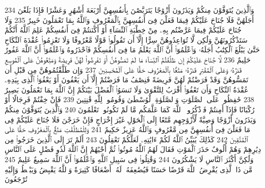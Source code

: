{\tiny\colorbox{cl_aya}{234}} وَٱلَّذِينَ يُتَوَفَّوْنَ مِنكُمْ وَيَذَرُونَ أَزْوَٰجًا يَتَرَبَّصْنَ بِأَنفُسِهِنَّ أَرْبَعَةَ أَشْهُرٍ وَعَشْرًا فَإِذَا بَلَغْنَ أَجَلَهُنَّ فَلَا جُنَاحَ عَلَيْكُمْ فِيمَا فَعَلْنَ فِىٓ أَنفُسِهِنَّ بِٱلْمَعْرُوفِ وَٱللَّهُ بِمَا تَعْمَلُونَ خَبِيرٌ
{\tiny\colorbox{cl_aya}{235}} وَلَا جُنَاحَ عَلَيْكُمْ فِيمَا عَرَّضْتُم بِهِۦ مِنْ خِطْبَةِ ٱلنِّسَآءِ أَوْ أَكْنَنتُمْ فِىٓ أَنفُسِكُمْ عَلِمَ ٱللَّهُ أَنَّكُمْ سَتَذْكُرُونَهُنَّ وَلَٰكِن لَّا تُوَاعِدُوهُنَّ سِرًّا إِلَّآ أَن تَقُولُوا۟ قَوْلًا مَّعْرُوفًا وَلَا تَعْزِمُوا۟ عُقْدَةَ ٱلنِّكَاحِ حَتَّىٰ يَبْلُغَ ٱلْكِتَٰبُ أَجَلَهُۥ وَٱعْلَمُوٓا۟ أَنَّ ٱللَّهَ يَعْلَمُ مَا فِىٓ أَنفُسِكُمْ فَٱحْذَرُوهُ وَٱعْلَمُوٓا۟ أَنَّ ٱللَّهَ غَفُورٌ حَلِيمٌ
{\tiny\colorbox{cl_aya}{236}} لَّا جُنَاحَ عَلَيْكُمْ إِن طَلَّقْتُمُ ٱلنِّسَآءَ مَا لَمْ تَمَسُّوهُنَّ أَوْ تَفْرِضُوا۟ لَهُنَّ فَرِيضَةً وَمَتِّعُوهُنَّ عَلَى ٱلْمُوسِعِ قَدَرُهُۥ وَعَلَى ٱلْمُقْتِرِ قَدَرُهُۥ مَتَٰعًۢا بِٱلْمَعْرُوفِ حَقًّا عَلَى ٱلْمُحْسِنِينَ
{\tiny\colorbox{cl_aya}{237}} وَإِن طَلَّقْتُمُوهُنَّ مِن قَبْلِ أَن تَمَسُّوهُنَّ وَقَدْ فَرَضْتُمْ لَهُنَّ فَرِيضَةً فَنِصْفُ مَا فَرَضْتُمْ إِلَّآ أَن يَعْفُونَ أَوْ يَعْفُوَا۟ ٱلَّذِى بِيَدِهِۦ عُقْدَةُ ٱلنِّكَاحِ وَأَن تَعْفُوٓا۟ أَقْرَبُ لِلتَّقْوَىٰ وَلَا تَنسَوُا۟ ٱلْفَضْلَ بَيْنَكُمْ إِنَّ ٱللَّهَ بِمَا تَعْمَلُونَ بَصِيرٌ
{\tiny\colorbox{cl_aya}{238}} حَٰفِظُوا۟ عَلَى ٱلصَّلَوَٰتِ وَٱلصَّلَوٰةِ ٱلْوُسْطَىٰ وَقُومُوا۟ لِلَّهِ قَٰنِتِينَ
{\tiny\colorbox{cl_aya}{239}} فَإِنْ خِفْتُمْ فَرِجَالًا أَوْ رُكْبَانًا فَإِذَآ أَمِنتُمْ فَٱذْكُرُوا۟ ٱللَّهَ كَمَا عَلَّمَكُم مَّا لَمْ تَكُونُوا۟ تَعْلَمُونَ
{\tiny\colorbox{cl_aya}{240}} وَٱلَّذِينَ يُتَوَفَّوْنَ مِنكُمْ وَيَذَرُونَ أَزْوَٰجًا وَصِيَّةً لِّأَزْوَٰجِهِم مَّتَٰعًا إِلَى ٱلْحَوْلِ غَيْرَ إِخْرَاجٍ فَإِنْ خَرَجْنَ فَلَا جُنَاحَ عَلَيْكُمْ فِى مَا فَعَلْنَ فِىٓ أَنفُسِهِنَّ مِن مَّعْرُوفٍ وَٱللَّهُ عَزِيزٌ حَكِيمٌ
{\tiny\colorbox{cl_aya}{241}} وَلِلْمُطَلَّقَٰتِ مَتَٰعٌۢ بِٱلْمَعْرُوفِ حَقًّا عَلَى ٱلْمُتَّقِينَ
{\tiny\colorbox{cl_aya}{242}} كَذَٰلِكَ يُبَيِّنُ ٱللَّهُ لَكُمْ ءَايَٰتِهِۦ لَعَلَّكُمْ تَعْقِلُونَ
{\tiny\colorbox{cl_aya}{243}} أَلَمْ تَرَ إِلَى ٱلَّذِينَ خَرَجُوا۟ مِن دِيَٰرِهِمْ وَهُمْ أُلُوفٌ حَذَرَ ٱلْمَوْتِ فَقَالَ لَهُمُ ٱللَّهُ مُوتُوا۟ ثُمَّ أَحْيَٰهُمْ إِنَّ ٱللَّهَ لَذُو فَضْلٍ عَلَى ٱلنَّاسِ وَلَٰكِنَّ أَكْثَرَ ٱلنَّاسِ لَا يَشْكُرُونَ
{\tiny\colorbox{cl_aya}{244}} وَقَٰتِلُوا۟ فِى سَبِيلِ ٱللَّهِ وَٱعْلَمُوٓا۟ أَنَّ ٱللَّهَ سَمِيعٌ عَلِيمٌ
{\tiny\colorbox{cl_aya}{245}} مَّن ذَا ٱلَّذِى يُقْرِضُ ٱللَّهَ قَرْضًا حَسَنًا فَيُضَٰعِفَهُۥ لَهُۥٓ أَضْعَافًا كَثِيرَةً وَٱللَّهُ يَقْبِضُ وَيَبْصُۜطُ وَإِلَيْهِ تُرْجَعُونَ
